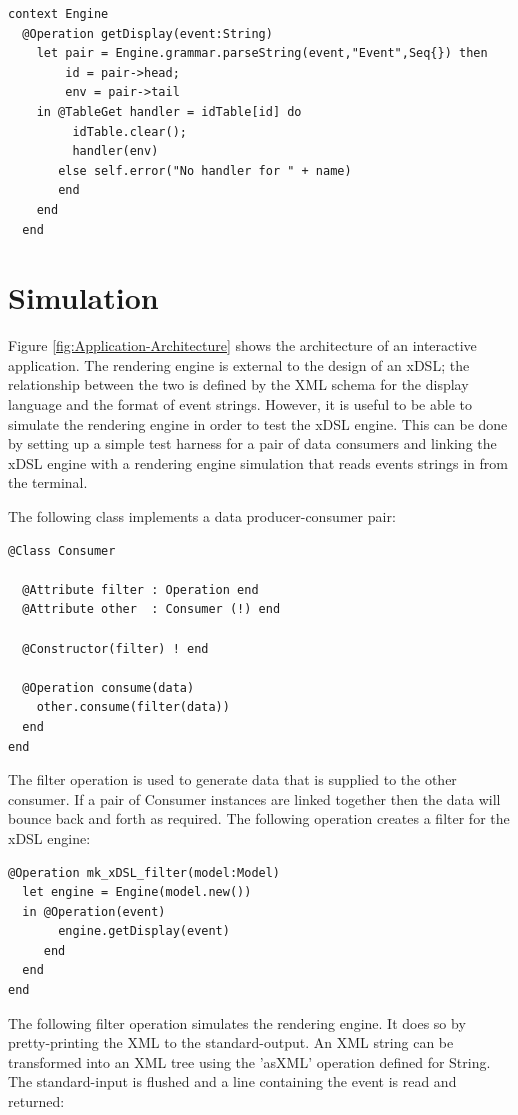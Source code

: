 \begin{lstlisting}
context Engine
  @Operation getDisplay(event:String)
    let pair = Engine.grammar.parseString(event,"Event",Seq{}) then
        id = pair->head;
        env = pair->tail
    in @TableGet handler = idTable[id] do
         idTable.clear();
         handler(env)
       else self.error("No handler for " + name)
       end
    end
  end
\end{lstlisting}
\section{Simulation\label{sec:Simulation}}

Figure \ref{fig:Application-Architecture} shows the architecture
of an interactive application. The rendering engine is external to
the design of an xDSL; the relationship between the two is defined
by the XML schema for the display language and the format of event
strings. However, it is useful to be able to simulate the rendering
engine in order to test the xDSL engine. This can be done by setting
up a simple test harness for a pair of data consumers and linking
the xDSL engine with a rendering engine simulation that reads events
strings in from the terminal.

The following class implements a data producer-consumer pair:

\begin{lstlisting}
@Class Consumer

  @Attribute filter : Operation end
  @Attribute other  : Consumer (!) end
    
  @Constructor(filter) ! end
    
  @Operation consume(data)
    other.consume(filter(data))
  end
end
\end{lstlisting}The filter operation is used to generate data that is supplied to
the other consumer. If a pair of Consumer instances are linked together
then the data will bounce back and forth as required. The following
operation creates a filter for the xDSL engine:

\begin{lstlisting}
@Operation mk_xDSL_filter(model:Model)
  let engine = Engine(model.new())
  in @Operation(event)
       engine.getDisplay(event)
     end
  end
end
\end{lstlisting}The following filter operation simulates the rendering engine. It
does so by pretty-printing the XML to the standard-output. An XML
string can be transformed into an XML tree using the 'asXML' operation
defined for String. The standard-input is flushed and a line containing
the event is read and returned:

